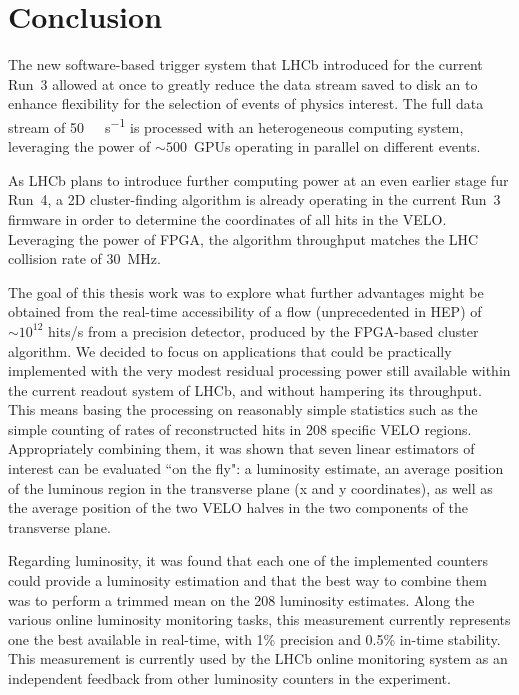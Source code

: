 
\chapter{Conclusion}
\label{chp:conclusion}
The new software-based trigger system that LHCb introduced for the current Run~3 allowed at once to greatly reduce the data stream saved to disk an to enhance flexibility for the selection of events of physics interest. The full data stream of \SI{50}{\tera\byte\per\second} is processed with an heterogeneous computing system, leveraging the power of $\sim 500$~GPUs operating in parallel on different events.

As LHCb plans to introduce further computing power at an even earlier stage fur Run~4, a 2D cluster-finding algorithm is already operating in the current Run~3 firmware in order to determine the coordinates of all hits in the VELO. Leveraging the power of FPGA, the algorithm throughput matches the LHC collision rate of \SI{30}{\mega\hertz}.

The goal of this thesis work was to explore what further advantages might be obtained from the real-time accessibility of a flow (unprecedented in HEP) of $\sim 10^{12}$ hits/s from a precision detector, produced by the FPGA-based cluster algorithm. We decided to focus on applications that could be practically implemented with the very modest residual processing power still available within the current readout system of LHCb, and without hampering its throughput. This means basing the processing on reasonably simple statistics such as the simple counting of rates of reconstructed hits in 208 specific VELO regions. Appropriately combining them, it was shown that seven linear estimators of interest can be evaluated ``on the fly": a luminosity estimate, an average position of the luminous region in the transverse plane (x and y coordinates), as well as the average position of the two VELO halves in the two components of the transverse plane.

Regarding luminosity, it was found that each one of the implemented counters could provide a luminosity estimation and that the best way to combine them was to perform a trimmed mean on the 208 luminosity estimates. Along the various online luminosity monitoring tasks, this measurement currently represents one the best available in real-time, with 1\% precision and 0.5\% in-time stability. This measurement is currently used by the LHCb online monitoring system as an independent feedback from other luminosity counters in the experiment.

